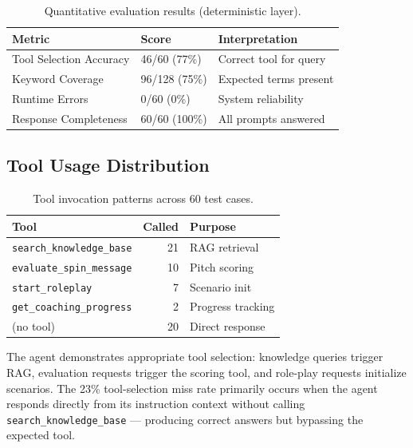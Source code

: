 \documentclass[10pt,twocolumn,a4paper]{article}
\begin{document}
\begin{table}[t]
\caption{Quantitative evaluation results (deterministic layer).}
\label{tab:deterministic}
\setlength{\tabcolsep}{30pt}
\renewcommand{\arraystretch}{1.4}
\begin{tabular}{l l l}
\toprule
\textbf{Metric} & \textbf{Score} & \textbf{Interpretation} \\
\midrule
Tool Selection Accuracy & 46/60 (77\%) & Correct tool for query \\
Keyword Coverage & 96/128 (75\%) & Expected terms present \\
Runtime Errors & 0/60 (0\%) & System reliability \\
Response Completeness & 60/60 (100\%) & All prompts answered \\
\bottomrule
\end{tabular}
\end{table}

\subsection{Tool Usage Distribution}

\begin{table}[t]
\caption{Tool invocation patterns across 60 test cases.}
\label{tab:toolusage}
\setlength{\tabcolsep}{30pt}
\renewcommand{\arraystretch}{1.4}
\begin{tabular}{l r l}
\toprule
\textbf{Tool} & \textbf{Called} & \textbf{Purpose} \\
\midrule
\texttt{search\_knowledge\_base} & 21 & RAG retrieval \\
\texttt{evaluate\_spin\_message} & 10 & Pitch scoring \\
\texttt{start\_roleplay} & 7 & Scenario init \\
\texttt{get\_coaching\_progress} & 2 & Progress tracking \\
(no tool) & 20 & Direct response \\
\bottomrule
\end{tabular}
\end{table}

The agent demonstrates appropriate tool selection: knowledge queries trigger RAG, evaluation requests trigger the scoring tool, and role-play requests initialize scenarios. The 23\% tool-selection miss rate primarily occurs when the agent responds directly from its instruction context without calling \texttt{search\_knowledge\_base} --- producing correct answers but bypassing the expected tool.
\end{document}
